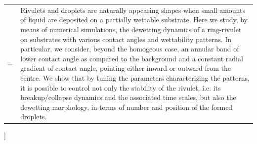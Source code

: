 \documentclass[twoside,twocolumn,9pt]{article}
\begin{document}
\begin{@twocolumnfalse}
\begin{tabular}{m{4.5cm} p{13.5cm} }
\includegraphics{head_foot/dates} & \noindent\normalsize{
\noindent Rivulets and droplets are naturally appearing shapes when small amounts of liquid are deposited on a partially wettable substrate.
Here we study, by means of numerical simulations, the dewetting dynamics of a ring-rivulet on substrates with various contact angles and wettability patterns.
In particular, we consider, beyond the homogeous case, an annular band of lower contact angle as compared to the background and a constant radial gradient of contact angle, pointing either inward or outward from the centre. 
We show that by tuning the parameters characterizing the patterns, it is possible to control 
not only the stability of the rivulet, i.e. its breakup/collapse dynamics and 
the associated time scales, but also the dewetting morphology, in terms of number and position of the formed droplets.
}

\end{tabular}

 \end{@twocolumnfalse} \vspace{0.6cm}

]

\renewcommand*\rmdefault{bch}\normalfont\upshape
\rmfamily
\section*{}
\vspace{-1cm}



\end{document}
